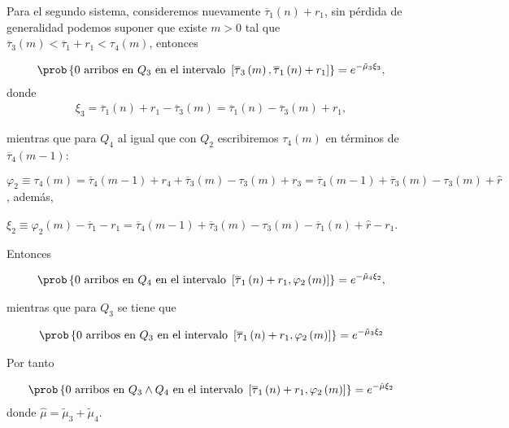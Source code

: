 Para el segundo sistema, consideremos nuevamente $\overline{\tau}_{1}\left(n\right)+r_{1}$, sin p\'erdida de generalidad podemos suponer que existe $m>0$ tal que $\overline{\tau}_{3}\left(m\right)<\overline{\tau}_{1}+r_{1}<\tau_{4}\left(m\right)$, entonces

\begin{eqnarray}
\prob\left\{0 \textrm{ arribos en }Q_{3}\textrm{ en el intervalo }\left[\overline{\tau}_{3}\left(m\right),\overline{\tau}_{1}\left(n\right)+r_{1}\right]\right\}
=e^{-\tilde{\mu}_{3}\xi_{3}},
\end{eqnarray}
donde 
\begin{eqnarray}
\xi_{3}=\overline{\tau}_{1}\left(n\right)+r_{1}-\overline{\tau}_{3}\left(m\right)=
\overline{\tau}_{1}\left(n\right)-\overline{\tau}_{3}\left(m\right)+r_{1},
\end{eqnarray}

mientras que para $Q_{4}$ al igual que con $Q_{2}$ escribiremos $\tau_{4}\left(m\right)$ en t\'erminos de $\overline{\tau}_{4}\left(m-1\right)$:

$\varphi_{2}\equiv\tau_{4}\left(m\right)=\overline{\tau}_{4}\left(m-1\right)+r_{4}+\overline{\tau}_{3}\left(m\right)
-\tau_{3}\left(m\right)+r_{3}=\overline{\tau}_{4}\left(m-1\right)+\overline{\tau}_{3}\left(m\right)
-\tau_{3}\left(m\right)+\hat{r}$, adem\'as,

$\xi_{2}\equiv\varphi_{2}\left(m\right)-\overline{\tau}_{1}-r_{1}=\overline{\tau}_{4}\left(m-1\right)+\overline{\tau}_{3}\left(m\right)
-\tau_{3}\left(m\right)-\overline{\tau}_{1}\left(n\right)+\hat{r}-r_{1}$. 

Entonces


\begin{eqnarray}
\prob\left\{0 \textrm{ arribos en }Q_{4}\textrm{ en el intervalo }\left[\overline{\tau}_{1}\left(n\right)+r_{1},\varphi_{2}\left(m\right)\right]\right\}
=e^{-\tilde{\mu}_{4}\xi_{2}},
\end{eqnarray}

mientras que para $Q_{3}$ se tiene que 

\begin{eqnarray}
\prob\left\{0 \textrm{ arribos en }Q_{3}\textrm{ en el intervalo }\left[\overline{\tau}_{1}\left(n\right)+r_{1},\varphi_{2}\left(m\right)\right]\right\}
=e^{-\tilde{\mu}_{3}\xi_{2}}
\end{eqnarray}

Por tanto

\begin{eqnarray}
\prob\left\{0 \textrm{ arribos en }Q_{3}\wedge Q_{4}\textrm{ en el intervalo }\left[\overline{\tau}_{1}\left(n\right)+r_{1},\varphi_{2}\left(m\right)\right]\right\}
=e^{-\hat{\mu}\xi_{2}}
\end{eqnarray}
donde $\hat{\mu}=\tilde{\mu}_{3}+\tilde{\mu}_{4}$.

